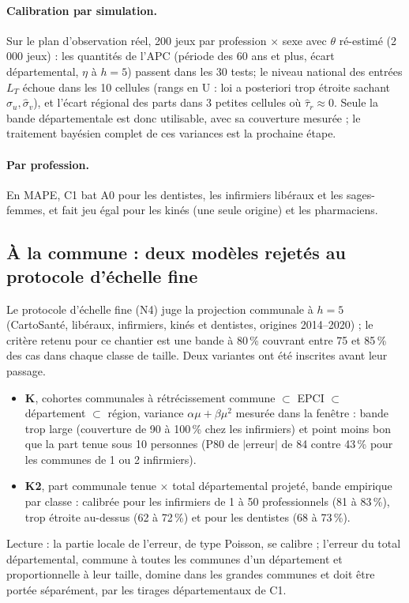 \documentclass[11pt]{article}
\begin{document}
\paragraph{Calibration par simulation.} Sur le plan d'observation réel, 200 jeux par profession
$\times$ sexe avec $\theta$ ré-estimé (2\,000 jeux) : les quantités de l'APC (période des 60 ans et
plus, écart départemental, $\eta$ à $h=5$) passent dans les 30 tests\mesure ; le niveau national des
entrées $L_T$ échoue dans les 10 cellules\mesure{} (rangs en U : loi a posteriori trop étroite
sachant $\hat\sigma_u, \hat\sigma_v$), et l'écart régional des parts dans 3 petites cellules\mesure{}
où $\hat\tau_r \approx 0$. Seule la bande départementale est donc utilisable, avec sa couverture
mesurée ; le traitement bayésien complet de ces variances est la prochaine étape.

\paragraph{Par profession.} En MAPE, C1 bat A0 pour les dentistes, les infirmiers libéraux et les
sages-femmes, et fait jeu égal pour les kinés (une seule origine) et les pharmaciens\mesure.

\subsection{À la commune : deux modèles rejetés au protocole d'échelle fine}
Le protocole d'échelle fine (N4) juge la projection communale à $h = 5$ (CartoSanté, libéraux,
infirmiers, kinés et dentistes, origines 2014--2020) ; le critère retenu pour ce chantier est une bande
à 80\,\% couvrant entre 75 et 85\,\% des cas dans chaque classe de taille. Deux variantes ont été
inscrites avant leur passage.
\begin{itemize}
  \item \textbf{K}, cohortes communales à rétrécissement commune $\subset$ EPCI $\subset$ département
        $\subset$ région, variance $\alpha\mu + \beta\mu^2$ mesurée dans la fenêtre : bande trop large
        (couverture de 90 à 100\,\%\mesure{} chez les infirmiers) et point moins bon que la part tenue
        sous 10 personnes (P80 de $|$erreur$|$ de 84 contre 43\,\%\mesure{} pour les communes de 1 ou
        2 infirmiers).
  \item \textbf{K2}, part communale tenue $\times$ total départemental projeté, bande empirique par
        classe : calibrée pour les infirmiers de 1 à 50 professionnels (81 à 83\,\%\mesure), trop
        étroite au-dessus (62 à 72\,\%\mesure) et pour les dentistes (68 à 73\,\%\mesure).
\end{itemize}
Lecture\derive{} : la partie locale de l'erreur, de type Poisson, se calibre ; l'erreur du total
départemental, commune à toutes les communes d'un département et proportionnelle à leur taille, domine
dans les grandes communes et doit être portée séparément, par les tirages départementaux de C1.
\end{document}
